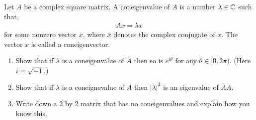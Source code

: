 \documentclass[10pt]{article}
\begin{document}
\begin{problem}
Let \( A \) be a complex square matrix. A coneigenvalue of \( A \) is a number \( \lambda\in\mathbb{C} \) such that,
\begin{align*}
    A \overline{x}  = \lambda x
\end{align*}
    for some nonzero vector \( x \), where \( \overline{x} \) denotes the complex conjugate of \( x \). The vector \( x \) is called a coneigenvector.
    \begin{enumerate}[label=(\alph*),nolistsep]
        \item Show that if \( \lambda \) is a coneigenvalue of \( A \) then so is \( e^{i \theta} \) for any \( \theta \in [0,2\pi) \). (Here \( i = \sqrt{-1} \).)
        \item Show that if \( \lambda \) is a coneignevalue of \( A \) then \( |\lambda|^2 \) is an eigenvalue of \( \overline{A}A \).
        \item Write down a 2 by 2 matrix that has no coneigenvalues and explain how you know this.
    \end{enumerate}
\end{problem}
\end{document}
